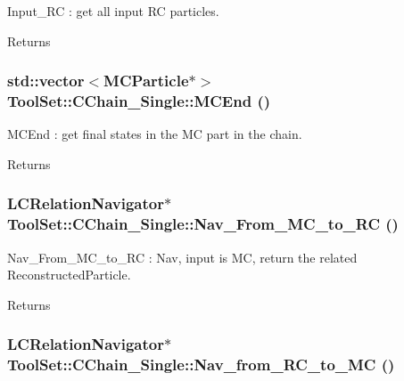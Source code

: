 Input\_\-RC : get all input RC particles. \begin{DoxyReturn}{Returns}

\end{DoxyReturn}
\hypertarget{classToolSet_1_1CChain__Single_a9762b2584dc5f7eef1036fda5dfb98b5}{
\subsubsection[{MCEnd}]{\setlength{\rightskip}{0pt plus 5cm}std::vector$<$MCParticle$\ast$$>$ ToolSet::CChain\_\-Single::MCEnd ()}}
\label{classToolSet_1_1CChain__Single_a9762b2584dc5f7eef1036fda5dfb98b5}


MCEnd : get final states in the MC part in the chain. \begin{DoxyReturn}{Returns}

\end{DoxyReturn}
\hypertarget{classToolSet_1_1CChain__Single_a366ba84d1f485f8b5aa62b6540568774}{
\subsubsection[{Nav\_\-From\_\-MC\_\-to\_\-RC}]{\setlength{\rightskip}{0pt plus 5cm}LCRelationNavigator$\ast$ ToolSet::CChain\_\-Single::Nav\_\-From\_\-MC\_\-to\_\-RC ()}}
\label{classToolSet_1_1CChain__Single_a366ba84d1f485f8b5aa62b6540568774}


Nav\_\-From\_\-MC\_\-to\_\-RC : Nav, input is MC, return the related ReconstructedParticle. \begin{DoxyReturn}{Returns}

\end{DoxyReturn}
\hypertarget{classToolSet_1_1CChain__Single_a32a9327c08d4aa218d2510b1288045de}{
\subsubsection[{Nav\_\-from\_\-RC\_\-to\_\-MC}]{\setlength{\rightskip}{0pt plus 5cm}LCRelationNavigator$\ast$ ToolSet::CChain\_\-Single::Nav\_\-from\_\-RC\_\-to\_\-MC ()}}
\label{classToolSet_1_1CChain__Single_a32a9327c08d4aa218d2510b1288045de}


